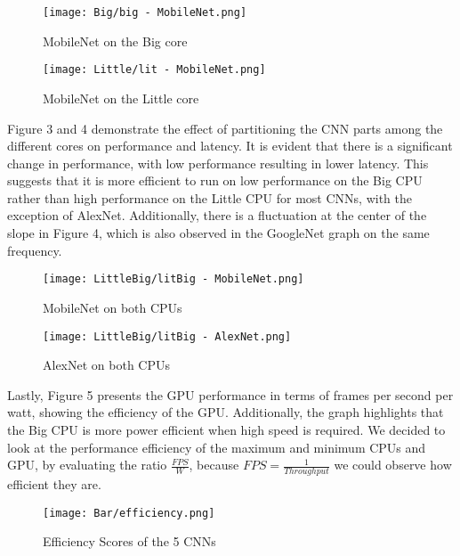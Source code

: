 \documentclass[a4paper, 12pt, fleqn]{article}
\begin{document}
\begin{figure}[ht]
\centering
\begin{minipage}{.5\textwidth}
  \centering
  \texttt{[image: Big/big - MobileNet.png]}
  \caption{MobileNet on the Big core}
  \label{fig:big_1}
\end{minipage}%
\begin{minipage}{.5\textwidth}
  \centering
  \texttt{[image: Little/lit - MobileNet.png]}
  \caption{MobileNet on the Little core}
  \label{fig:lit_1}
\end{minipage}
\end{figure}

Figure 3 and 4 demonstrate the effect of partitioning the CNN parts among the different cores on performance and latency. It is evident that there is a significant change in performance, with low performance resulting in lower latency. This suggests that it is more efficient to run on low performance on the Big CPU rather than high performance on the Little CPU for most CNNs, with the exception of AlexNet. Additionally, there is a fluctuation at the center of the slope in Figure 4, which is also observed in the GoogleNet graph on the same frequency.

\begin{figure}[ht]
\centering
\begin{minipage}{.5\textwidth}
  \centering
  \texttt{[image: LittleBig/litBig - MobileNet.png]}
  \caption{MobileNet on both CPUs}
  \label{fig:litBig_1}
\end{minipage}%
\begin{minipage}{.5\textwidth}
  \centering
  \texttt{[image: LittleBig/litBig - AlexNet.png]}
  \caption{AlexNet on both CPUs}
  \label{fig:litBig_2}
\end{minipage}
\end{figure}

Lastly, Figure 5 presents the GPU performance in terms of frames per second per watt, showing the efficiency of the GPU. Additionally, the graph highlights that the Big CPU is more power efficient when high speed is required. We decided to look at the performance efficiency of the maximum and minimum CPUs and GPU, by evaluating the ratio $\frac{FPS}{W}$, because $FPS = \frac{1}{Throughput}$ we could observe how efficient they are.

\begin{figure}[ht]
    \centering
    \texttt{[image: Bar/efficiency.png]}
    \caption{Efficiency Scores of the 5 CNNs}
    \label{fig:my_label}
\end{figure}
\end{document}
